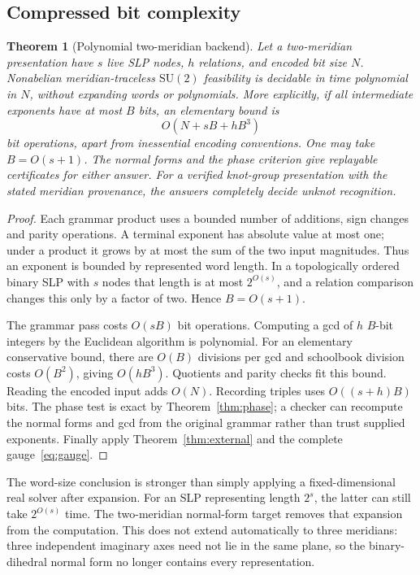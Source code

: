 \documentclass[11pt]{article}
\newtheorem{theorem}{Theorem}[section]
\theoremstyle{definition}
\theoremstyle{remark}
\newcommand{\SU}{\mathrm{SU}(2)}
\begin{document}
\subsection{Compressed bit complexity}
\begin{theorem}[Polynomial two-meridian backend]
\label{thm:two}
Let a two-meridian presentation have $s$ live SLP nodes, $h$ relations, and encoded bit size $N$. Nonabelian meridian-traceless $\SU$ feasibility is decidable in time polynomial in $N$, without expanding words or polynomials. More explicitly, if all intermediate exponents have at most $B$ bits, an elementary bound is
\begin{equation}
O(N+sB+hB^3)
\label{eq:two-cost}
\end{equation}
bit operations, apart from inessential encoding conventions. One may take $B=O(s+1)$. The normal forms and the phase criterion give replayable certificates for either answer. For a verified knot-group presentation with the stated meridian provenance, the answers completely decide unknot recognition.
\end{theorem}
\begin{proof}
Each grammar product uses a bounded number of additions, sign changes and parity operations. A terminal exponent has absolute value at most one; under a product it grows by at most the sum of the two input magnitudes. Thus an exponent is bounded by represented word length. In a topologically ordered binary SLP with $s$ nodes that length is at most $2^{O(s)}$, and a relation comparison changes this only by a factor of two. Hence $B=O(s+1)$.

The grammar pass costs $O(sB)$ bit operations. Computing a gcd of $h$ $B$-bit integers by the Euclidean algorithm is polynomial. For an elementary conservative bound, there are $O(B)$ divisions per gcd and schoolbook division costs $O(B^2)$, giving $O(hB^3)$. Quotients and parity checks fit this bound. Reading the encoded input adds $O(N)$. Recording triples uses $O((s+h)B)$ bits. The phase test is exact by Theorem~\ref{thm:phase}; a checker can recompute the normal forms and gcd from the original grammar rather than trust supplied exponents. Finally apply Theorem~\ref{thm:external} and the complete gauge~\eqref{eq:gauge}.
\end{proof}

The word-size conclusion is stronger than simply applying a fixed-dimensional real solver after expansion. For an SLP representing length $2^s$, the latter can still take $2^{O(s)}$ time. The two-meridian normal-form target removes that expansion from the computation. This does not extend automatically to three meridians: three independent imaginary axes need not lie in the same plane, so the binary-dihedral normal form no longer contains every representation.
\end{document}
